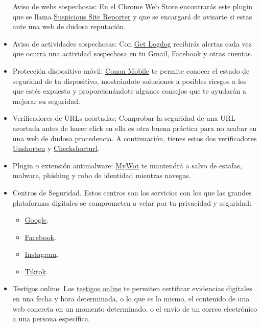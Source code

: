 \documentclass[
  spanish,
  a4paper,
  openany]{book}
\begin{document}
\begin{itemize}
  Aviso de webs sospechosas: En el Chrome Web Store encontrarás este plugin que se llama \href{https://chrome.google.com/webstore/detail/suspicious-site-reporter/jknemblkbdhdcpllfgbfekkdciegfboi}{Suspicious Site Reporter} y que se encargará de avisarte si estas ante una web de dudosa reputación.
\item
  Aviso de actividades sospechosas: Con \href{https://getlogdog.com/}{Get Logdog} recibirás alertas cada vez que ocurra una actividad sospechosa en tu Gmail, Facebook y otras cuentas.
\item
  Protección dispositivo móvil: \href{https://www.osi.es/es/conan-mobile}{Conan Mobile} te permite conocer el estado de seguridad de tu dispositivo, mostrándote soluciones a posibles riesgos a los que estés expuesto y proporcionándote algunos consejos que te ayudarán a mejorar su seguridad.
\item
  Verificadores de URLs acortadas: Comprobar la seguridad de una URL acortada antes de hacer click en ella es otra buena práctica para no acabar en una web de dudosa procedencia. A continuación, tienes estos dos verificadores \href{https://unshorten.it/}{Unshorten} y \href{https://checkshorturl.com/}{Checkshorturl}.
\item
  Plugin o extensión antimalware: \href{https://www.mywot.com/}{MyWot} te mantendrá a salvo de estafas, malware, phishing y robo de identidad mientras navegas.
\item
  Centros de Seguridad. Estos centros son los servicios con los que las grandes plataformas digitales se comprometen a velar por tu privacidad y seguridad:

  \begin{itemize}
  \item
    \href{https://safety.google}{Google}.
  \item
    \href{https://es-es.facebook.com/safety}{Facebook}.
  \item
    \href{https://about.instagram.com/es-la/community/safety}{Instagram}.
  \item
    \href{https://www.tiktok.com/safety?lang=es}{Tiktok}.
  \end{itemize}
\item
  Testigos online: Los \href{https://www.osi.es/es/actualidad/blog/2022/01/26/testigos-online-y-obtencion-de-pruebas-te-explicamos-su-utilidad}{testigos online} te permiten certificar evidencias digitales en una fecha y hora determinada, o lo que es lo mismo, el contenido de una web concreta en un momento determinado, o el envío de un correo electrónico a una persona específica.
\end{itemize}
\end{document}
